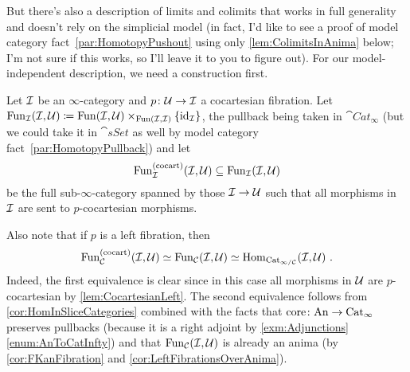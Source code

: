 %	
%
But there's also a description of limits and colimits that works in full generality and doesn't rely on the simplicial model (in fact, I'd like to see a proof of model category fact~\cref{par:HomotopyPushout} using only \cref{lem:ColimitsInAnima} below; I'm not sure if this works, so I'll leave it to you to figure out). For our model-independent description, we need a construction first.
\begin{con}
	Let $\mathcal{I}$ be an $\infty$-category and $p\colon \mathcal{U}\rightarrow \mathcal{I}$ a cocartesian fibration. Let $\operatorname{Fun}_{\mathcal{I}}(\mathcal{I},\mathcal{U})\coloneqq \operatorname{Fun}(\mathcal{I},\mathcal{U})\times_{\operatorname{Fun}(\mathcal{I},\mathcal{I})}\{\operatorname{id}_{\mathcal{I}}\}$, the pullback being taken in $\cat{Cat}_\infty$ (but we could take it in $\cat{sSet}$ as well by model category fact~\cref{par:HomotopyPullback}) and let
	\begin{equation*}
		\operatorname{Fun}_{\mathcal{I}}^{(\mathrm{cocart})}\!\left(\mathcal{I},\mathcal{U}\right)\subseteq \operatorname{Fun}_{\mathcal{I}}\!\left(\mathcal{I},\mathcal{U}\right)
	\end{equation*}
	be the full sub-$\infty$-category spanned by those $\mathcal{I}\rightarrow \mathcal{U}$ such that all morphisms in $\mathcal{I}$ are sent to $p$-cocartesian morphisms.
	
	Also note that if $p$ is a left fibration, then
	\begin{equation*}
		\operatorname{Fun}_{\mathcal{C}}^{(\mathrm{cocart})}\!\left(\mathcal{I},\mathcal{U}\right)\simeq \operatorname{Fun}_{\mathcal{C}}\!\left(\mathcal{I},\mathcal{U}\right)\simeq \operatorname{Hom}_{\mathrm{Cat}_{\infty/\mathcal{C}}}\!\left(\mathcal{I},\mathcal{U}\right)\,.
	\end{equation*}
	Indeed, the first equivalence is clear since in this case all morphisms in $\mathcal{U}$ are $p$-cocartesian by \cref{lem:CocartesianLeft}. The second equivalence follows from \cref{cor:HomInSliceCategories} combined with the facts that $\operatorname{core}\colon \mathrm{An}\rightarrow \mathrm{Cat}_\infty$ preserves pullbacks (because it is a right adjoint by \cref{exm:Adjunctions}\cref{enum:AnToCatInfty}) and that $\operatorname{Fun}_{\mathcal{C}}(\mathcal{I},\mathcal{U})$ is already an anima (by \cref{cor:FKanFibration} and \cref{cor:LeftFibrationsOverAnima}).
\end{con}
